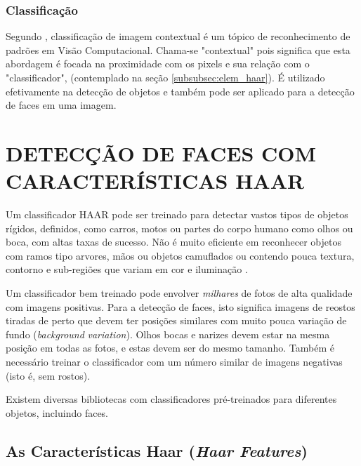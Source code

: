 \subsubsection{Classificação}\label{subsubsec:classificacao}

Segundo \cite{edinburgh_classifier}, classificação de imagem contextual é um tópico de reconhecimento de padrões em  Visão Computacional. Chama-se "contextual" pois significa que esta abordagem é focada na proximidade com os pixels e sua relação com o "classificador", (contemplado na seção \autoref{subsubsec:elem_haar}). É utilizado efetivamente na detecção de objetos e também pode ser aplicado para a detecção de faces em uma imagem.




\section{DETECÇÃO DE FACES COM CARACTERÍSTICAS HAAR}\label{sec:deteccao}

Um classificador HAAR pode ser treinado para detectar vastos tipos de objetos rígidos, definidos, como carros, motos ou partes do corpo humano como olhos ou boca, com altas taxas de sucesso. Não é muito eficiente em reconhecer objetos com ramos tipo arvores, mãos ou objetos camuflados ou contendo pouca textura, contorno e sub-regiões que variam em cor e iluminação \cite{drmathew_java_programming}.

Um classificador bem treinado pode envolver \textit{milhares} de fotos de alta qualidade com imagens positivas. Para a detecção de faces, isto significa imagens de reostos tiradas de perto que devem ter posições similares com muito pouca variação de fundo (\textit{background} \textit{variation}). Olhos bocas e narizes devem estar na mesma posição em todas as fotos, e estas devem ser do mesmo tamanho. Também é necessário treinar o classificador com um número similar de imagens negativas (isto é, sem rostos).

Existem diversas bibliotecas com classificadores pré-treinados para diferentes objetos, incluindo faces.


\subsection{As Características Haar (\textit{Haar Features}) }\label{subsubsec:elem_haar}

